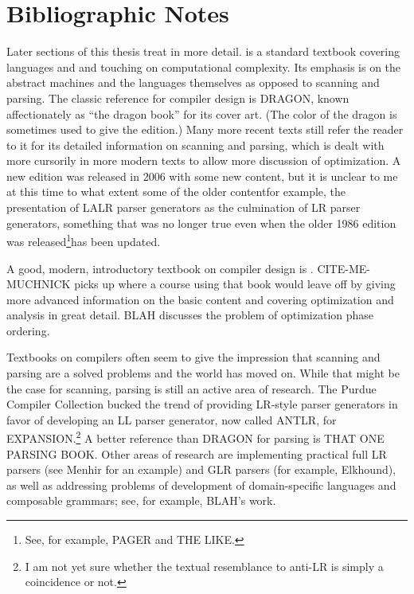 \section{Bibliographic Notes}\label{background:conclusion:bibliographicnotes}
Later sections of this thesis treat \lambdacalc in more detail. %
\citet{Hopcroft:Introduction:2007} is a standard textbook covering languages and \TMs and touching on computational complexity. Its emphasis is on the abstract machines and the languages themselves as opposed to scanning and parsing. The classic reference for compiler design is DRAGON, known affectionately as ``the dragon book'' for its cover art. (The color of the dragon is sometimes used to give the edition.) Many more recent texts still refer the reader to it for its detailed information on scanning and parsing, which is dealt with more cursorily in more modern texts to allow more discussion of optimization. A new edition was released in 2006 with some new content, but it is unclear to me at this time to what extent some of the older content\empause for example, the presentation of LALR parser generators as the culmination of LR parser generators, something that was no longer true even when the older 1986 edition was released\footnote{See, for example, PAGER and THE LIKE.}\empause has been updated.

A good, modern, introductory textbook on compiler design is \cite{Cooper:Engineering:2004}. CITE-ME-MUCHNICK picks up where a course using that book would leave off by giving more advanced information on the basic content and covering optimization and analysis in great detail. BLAH discusses the problem of optimization phase ordering.

Textbooks on compilers often seem to give the impression that scanning and parsing are a solved problems and the world has moved on. While that might be the case for scanning, parsing is still an active area of research. The Purdue Compiler Collection bucked the trend of providing LR-style parser generators in favor of developing an LL parser generator, now called ANTLR, for EXPANSION.\footnote{I am not yet sure whether the textual resemblance to anti-LR is simply a coincidence or not.} A better reference than DRAGON for parsing is THAT ONE PARSING BOOK. Other areas of research are implementing practical full LR parsers (see Menhir for an example) and GLR parsers (for example, Elkhound), as well as addressing problems of development of domain-specific languages and composable grammars; see, for example, BLAH's work.
